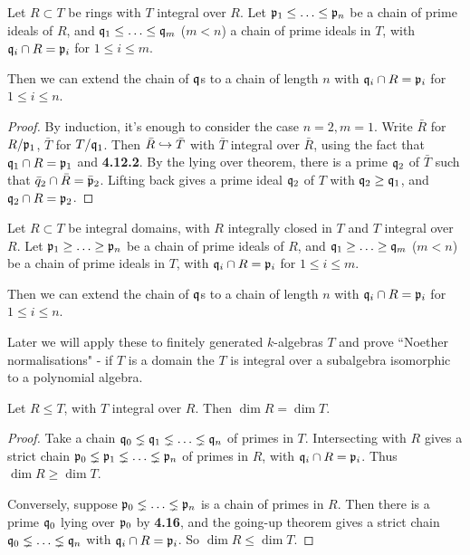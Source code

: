 \documentclass[10pt,a4paper]{article}
\begin{document}
\begin{theorem}
  Let $R \subset T$ be rings with $T$ integral over $R$. Let $\mathfrak{p}_1 \leq \ldots \leq \mathfrak{p}_n$ be a chain of prime ideals of $R$, and $\mathfrak{q}_1 \leq \ldots \leq \mathfrak{q}_m$ ($m<n$) a chain of prime ideals in $T$, with $\mathfrak{q}_i \cap R = \mathfrak{p}_i$ for $1\leq i \leq m$.

  Then we can extend the chain of $\mathfrak{q}$s to a chain of length $n$ with $\mathfrak{q}_i \cap R = \mathfrak{p}_i$ for $1 \leq i \leq n$.
\end{theorem}
\begin{proof}
  By induction, it's enough to consider the case $n = 2, m=1$. Write $\bar{R}$ for $R/\mathfrak{p}_1$, $\bar{T}$ for $T/\mathfrak{q}_1$. Then $\bar{R} \hookrightarrow \bar{T}$ with $\bar{T}$ integral over $\bar{R}$, using the fact that $\mathfrak{q}_1 \cap R = \mathfrak{p}_1$ and \textbf{4.12.2}. By the lying over theorem, there is a prime $\mathfrak{q}_2$ of $\bar{T}$ such that $\bar{q}_2 \cap \bar{R} = \bar{\mathfrak{p}}_2$. Lifting back gives a prime ideal $\mathfrak{q}_2$ of $T$ with $\mathfrak{q}_2 \geq \mathfrak{q}_1$, and $\mathfrak{q}_2 \cap R = \mathfrak{p}_2$.
\end{proof}
\begin{theorem}
  Let $R \subset T$ be integral domains, with $R$ integrally closed in $T$ and $T$ integral over $R$. Let $\mathfrak{p}_1 \geq \ldots \geq \mathfrak{p}_n$ be a chain of prime ideals of $R$, and $\mathfrak{q}_1 \geq \ldots \geq \mathfrak{q}_m$ ($m<n$) be a chain of prime ideals in $T$, with $\mathfrak{q}_i \cap R = \mathfrak{p}_i$ for $1 \leq i \leq m$.

  Then we can extend the chain of $\mathfrak{q}$s to a chain of length $n$ with $\mathfrak{q}_i \cap R = \mathfrak{p}_i$ for $1 \leq i \leq n$.
\end{theorem}
Later we will apply these to finitely generated $k$-algebras $T$ and prove ``Noether normalisations" - if $T$ is a domain the $T$ is integral over a subalgebra isomorphic to a polynomial algebra.

\begin{corollary}[of going up]
  Let $R \leq T$, with $T$ integral over $R$. Then $\dim R = \dim T$.
\end{corollary}
\begin{proof}
  Take a chain $\mathfrak{q}_0 \lneq \mathfrak{q}_1 \lneq \ldots \lneq \mathfrak{q}_n$ of primes in $T$. Intersecting with $R$ gives a strict chain $\mathfrak{p}_0 \lneq \mathfrak{p}_1 \lneq \ldots \lneq \mathfrak{p}_n$ of primes in $R$, with $\mathfrak{q}_i \cap R = \mathfrak{p}_i$. Thus $\dim R \geq \dim T$.

  Conversely, suppose $\mathfrak{p}_0 \lneq \ldots \lneq \mathfrak{p}_n$ is a chain of primes in $R$. Then there is a prime $\mathfrak{q}_0$ lying over $\mathfrak{p}_0$ by \textbf{4.16}, and the going-up theorem gives a strict chain $\mathfrak{q}_0 \lneq \ldots \lneq \mathfrak{q}_n$ with $\mathfrak{q}_i \cap R = \mathfrak{p}_i$. So $\dim R \leq \dim T$.
\end{proof}
\end{document}
